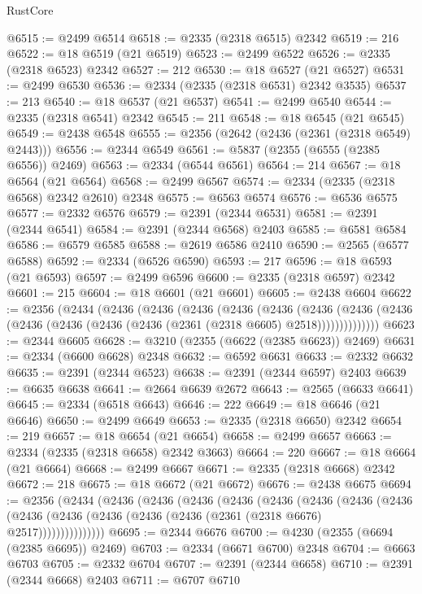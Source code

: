 \begin{lexlean}{RustCore}
\begin{coremodule}
@6515 := @2499 @6514
@6518 := @2335 (@2318 @6515) @2342
@6519 := 216
@6522 := @18 @6519 (@21 @6519)
@6523 := @2499 @6522
@6526 := @2335 (@2318 @6523) @2342
@6527 := 212
@6530 := @18 @6527 (@21 @6527)
@6531 := @2499 @6530
@6536 := @2334 (@2335 (@2318 @6531) @2342 @3535)
@6537 := 213
@6540 := @18 @6537 (@21 @6537)
@6541 := @2499 @6540
@6544 := @2335 (@2318 @6541) @2342
@6545 := 211
@6548 := @18 @6545 (@21 @6545)
@6549 := @2438 @6548
@6555 := @2356 (@2642 (@2436 (@2361 (@2318 @6549) @2443)))
@6556 := @2344 @6549
@6561 := @5837 (@2355 (@6555 (@2385 @6556)) @2469)
@6563 := @2334 (@6544 @6561)
@6564 := 214
@6567 := @18 @6564 (@21 @6564)
@6568 := @2499 @6567
@6574 := @2334 (@2335 (@2318 @6568) @2342 @2610) @2348
@6575 := @6563 @6574
@6576 := @6536 @6575
@6577 := @2332 @6576
@6579 := @2391 (@2344 @6531)
@6581 := @2391 (@2344 @6541)
@6584 := @2391 (@2344 @6568) @2403
@6585 := @6581 @6584
@6586 := @6579 @6585
@6588 := @2619 @6586 @2410
@6590 := @2565 (@6577 @6588)
@6592 := @2334 (@6526 @6590)
@6593 := 217
@6596 := @18 @6593 (@21 @6593)
@6597 := @2499 @6596
@6600 := @2335 (@2318 @6597) @2342
@6601 := 215
@6604 := @18 @6601 (@21 @6601)
@6605 := @2438 @6604
@6622 := @2356
    (@2434
      (@2436
        (@2436
          (@2436
            (@2436
              (@2436
                (@2436
                  (@2436 (@2436 (@2436 (@2436 (@2436 (@2436 (@2361 (@2318 @6605) @2518))))))))))))))
@6623 := @2344 @6605
@6628 := @3210 (@2355 (@6622 (@2385 @6623)) @2469)
@6631 := @2334 (@6600 @6628) @2348
@6632 := @6592 @6631
@6633 := @2332 @6632
@6635 := @2391 (@2344 @6523)
@6638 := @2391 (@2344 @6597) @2403
@6639 := @6635 @6638
@6641 := @2664 @6639 @2672
@6643 := @2565 (@6633 @6641)
@6645 := @2334 (@6518 @6643)
@6646 := 222
@6649 := @18 @6646 (@21 @6646)
@6650 := @2499 @6649
@6653 := @2335 (@2318 @6650) @2342
@6654 := 219
@6657 := @18 @6654 (@21 @6654)
@6658 := @2499 @6657
@6663 := @2334 (@2335 (@2318 @6658) @2342 @3663)
@6664 := 220
@6667 := @18 @6664 (@21 @6664)
@6668 := @2499 @6667
@6671 := @2335 (@2318 @6668) @2342
@6672 := 218
@6675 := @18 @6672 (@21 @6672)
@6676 := @2438 @6675
@6694 := @2356
    (@2434
      (@2436
        (@2436
          (@2436
            (@2436
              (@2436
                (@2436
                  (@2436
                    (@2436
                      (@2436 (@2436 (@2436 (@2436 (@2436 (@2361 (@2318 @6676) @2517)))))))))))))))
@6695 := @2344 @6676
@6700 := @4230 (@2355 (@6694 (@2385 @6695)) @2469)
@6703 := @2334 (@6671 @6700) @2348
@6704 := @6663 @6703
@6705 := @2332 @6704
@6707 := @2391 (@2344 @6658)
@6710 := @2391 (@2344 @6668) @2403
@6711 := @6707 @6710

\end{coremodule}
\end{lexlean}
